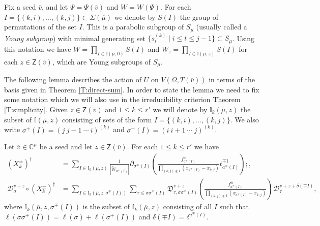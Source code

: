 \documentclass[11pt,fleqn]{amsart}
\newcounter{para}[section]
\newcommand\CC{\mathbb C}
\newcommand\II{\mathbb I}
\newcommand\D[3]{{}^{#1} \mathfrak D_{#2}^{#3}}
\newcommand\DD[3]{{}^{#1} \mathcal D_{#2}^{#3}}
\newcommand\Z{\mathsf Z}
\newcommand\vv{\overline{v}}
\begin{document}
Fix a seed $\vv$, and let $\Psi = \Psi(\vv)$ and $W = W(\Psi)$. For each 
$I = \{(k,i), \ldots, (k,j)\} \subset \Sigma(\overline \mu)$ we denote by 
$S(I)$ the group of permutations of the set $I$. This is a parabolic subgroup 
of $S_\mu$ (usually called a \emph{Young subgroup}) with minimal generating 
set $\{s_t^{(k)} \mid i \leq t \leq j - 1\} \subset S_\mu$. Using this 
notation we have  $W = \prod_{I \in \II(\overline \mu, 0)} S(I)$ and 
$W_z = \prod_{I \in \II(\overline \mu, z)} S(I)$ for each $z \in \Z(\vv)$, 
which are Young subgroups of $S_\mu$. 


The following lemma describes the action of $U$ on $V(\Omega, T(\vv))$ in 
terms of the basis given in Theorem \ref{T:direct-sum}. In order to 
state the lemma  we need to fix some notation which we will also use in the 
irreducibility criterion Theorem \ref{T:simplicity}. Given $z \in \Z(\vv)$ and 
$1 \leq k \leq r'$ we will denote by $\II_k(\overline \mu, z)$ the subset 
of $\II(\overline \mu, z)$ consisting of sets of the form $I = \{(k,i), 
\ldots, (k,j)\}$. We also write $\sigma^+(I) = (j \ j-1 \ \cdots \ i)^{(k)}$ 
and $\sigma^-(I) = (i \ i+1 \ \cdots \ j)^{(k)}$.
\begin{Lemma}
\label{L:formulas}
Let $\vv \in \CC^{\mu}$ be a seed and let $z \in \Z(\vv)$. For each $1 \leq k 
\leq r'$ we have 
\begin{align*}
(X^\pm_k)^\dagger
 &= \sum_{I \in \II_k(\overline \mu, z)}
 \frac{1}{|\widetilde W_{a^\mp(I)}|} \partial_{\sigma^\mp(I)}
 \left(
 \frac{f^\pm_{a^{\mp}(I)}}{\prod_{(k,j) \notin I} (x_{a^\mp(I)}-x_{k,j})}
 t_{a^{\mp}(I)}^{\mp 1}
 \right);,\\
\DD{}{\sigma}{\vv+z} \circ (X_k^\pm)^\dagger
 &= \sum_{I \in \II_k(\overline \mu, z, \sigma^\mp(I))}
 \sum_{\tau \leq \sigma \sigma^\mp(I)}
 \D{}{\tau, \sigma \sigma^\mp(I)}{\vv + z} \left( 
 \frac{f^\pm_{a^\mp(I)}}{\displaystyle
 \prod_{(k,j) \notin I} (x_{a^\mp(I)} - x_{k,j})} 
 \right) \DD{}{\tau}{\vv + z + \delta(\mp I)},
\end{align*}
where $\II_k(\overline \mu, z, \sigma^\mp(I))$ is the subset of 
$\II_k(\overline \mu, z)$ consisting of all $I$ such that $\ell(\sigma 
\sigma^\mp(I)) = \ell(\sigma) + \ell(\sigma^\mp(I))$ and $\delta(\mp I) = 
\delta^{a^\mp(I)}$. 
\end{Lemma}
\end{document}

